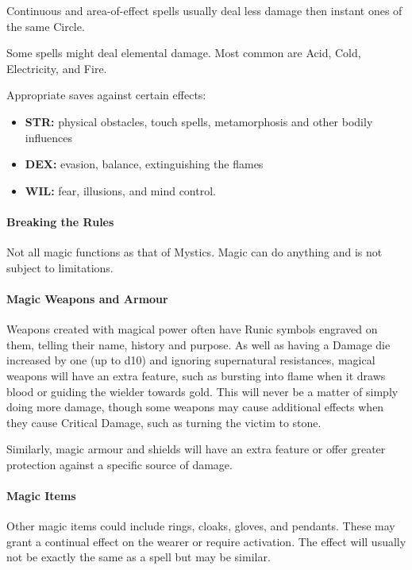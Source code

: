 \documentclass[itdr]{subfiles}
\begin{document}
Continuous and area-of-effect spells usually deal less damage then instant ones of the same Circle.

Some spells might deal elemental damage. Most common are Acid, Cold, Electricity, and Fire.

Appropriate saves against certain effects:
\begin{itemize}
	\item \textbf{STR:} physical obstacles, touch spells, metamorphosis and other bodily influences
	\item \textbf{DEX:} evasion, balance, extinguishing the flames
	\item \textbf{WIL:} fear, illusions, and mind control.
\end{itemize}

\vfill
\break

\paragraph{Breaking the Rules}
Not all magic functions as that of Mystics. Magic can do anything and is not subject to limitations.

\paragraph{Magic Weapons and Armour}
Weapons created with magical power often have Runic symbols engraved on them, telling their name, history and purpose. As well as having a Damage die increased by one (up to d10) and ignoring supernatural resistances, magical weapons will have an extra feature, such as bursting into flame when it draws blood or guiding the wielder towards gold. This will never be a matter of simply doing more damage, though some weapons may cause additional effects when they cause Critical Damage, such as turning the victim to stone.

Similarly, magic armour and shields will have an extra feature or offer greater protection against a specific source of damage.

\paragraph{Magic Items}
Other magic items could include rings, cloaks, gloves, and pendants. These may grant a continual effect on the wearer or require activation. The effect will usually not be exactly the same as a spell but may be similar.
\end{document}
